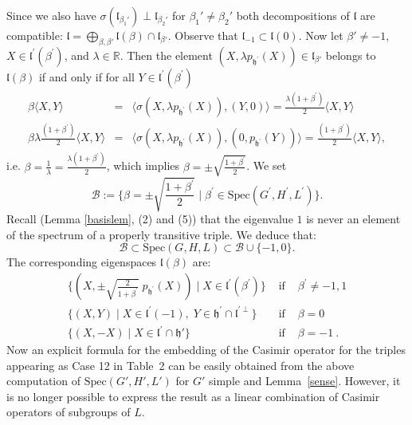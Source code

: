 \documentclass[10]{amsart}
\theoremstyle{remark}
\theoremstyle{definition}
\numberwithin{equation}{section}
\newcommand{\R}{\mathbb{R}}           %
\newcommand{\fh}{{\mathfrak h}}
\newcommand{\fl}{{\mathfrak l}}
\newcommand{\Cal}{\mathcal}
\begin{document}
{%
%
Since we also have $\sigma(\fl_{\beta_1'})\perp \fl_{\beta_2'}$ for $\beta_1'\ne\beta_2'$ both decompositions of $\fl$ are compatible: $\fl=\bigoplus_{\beta,\beta'}\fl(\beta)\cap \fl_{\beta'}$.
Observe that $\fl_{-1}\subset \fl(0)$. Now let $\beta'\ne-1$,
$X\in{\mathfrak l}^\prime(\beta^\prime)$, and $\lambda\in\R$. Then the element $(X,\lambda p_{\fh^\prime}(X))\in \fl_{\beta'}$ belongs to $\fl(\beta)$ if and only if for
all $Y\in {\mathfrak l}^\prime(\beta^\prime)$
%
\begin{eqnarray*}
\beta\langle X,Y\rangle&=&\langle \sigma(X,\lambda p_{\fh^\prime}(X)),(Y,0)\rangle=\frac{\lambda(1+\beta^\prime)}{2}\langle X,Y\rangle\\
\beta\lambda\frac{(1+\beta^\prime)}{2}\langle X,Y\rangle&=&\langle \sigma(X,\lambda p_{\fh^\prime}(X)),(0,p_{\fh^\prime}(Y))\rangle=\frac{(1+\beta^\prime)}{2}\langle X,Y\rangle,
\end{eqnarray*}
%
i.e.  $\beta=\frac{1}{\lambda}=\frac{\lambda(1+\beta^\prime)}{2}$, which implies $\beta=\pm\sqrt{\frac{1+\beta^\prime}{2}}$. 
We set
$$ {\Cal B}:=\Big\{\beta=\pm\sqrt{\frac{1+\beta^\prime}{2}}\mid\beta^\prime\in\text{Spec}(G^\prime,H^\prime, L^\prime)\Big\} .$$
Recall (Lemma \ref{basislem}, (2) and (5)) that the eigenvalue $1$ is never an element of the spectrum of a properly transitive triple. We deduce that: 
%
\begin{equation*}
{\Cal B}\subset\text{Spec}(G,H,L)\subset{\Cal B}\cup\{-1,0\}.
\end{equation*}
%
The corresponding eigenspaces $\fl(\beta)$ are:
%
\begin{eqnarray*}
\Big\{(X,\pm\sqrt{\frac{2}{1+\beta^\prime}}\; p_{\fh^\prime}(X))\mid X\in{\mathfrak l}^\prime(\beta^\prime)\Big\} &\text{ if }& \beta^\prime\neq -1,1\\
\Big\{(X,Y)\mid X\in{\mathfrak l}^\prime(-1),\; Y\in{\mathfrak h}^\prime\cap{\mathfrak l}^{\prime\perp}\Big\} &\text{ if }& \beta=0\\
\Big\{(X,-X)\mid X\in{\mathfrak l}^\prime\cap \fh'\Big\} &\text{ if }& \beta= -1\: .
\end{eqnarray*}
%
Now an explicit formula for the embedding of the Casimir operator for the triples appearing as Case 12 in Table~2 can be easily obtained from  the above  computation of $\mathrm{Spec}(G',H',L')$
for $G'$ simple and Lemma~\ref{sense}. However, it is no longer possible to express the result as a linear combination of Casimir operators of subgroups of $L$.

}
\end{document}
